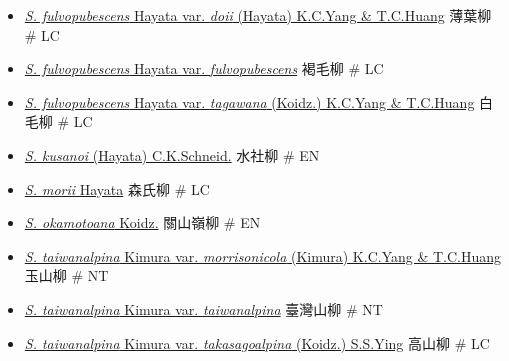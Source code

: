 \begin{itemize}
  \begin{itemize}
        \item[] \href{http://www.theplantlist.org/tpl1.1/search?q=Salix+fulvopubescens+var.+doii}{\textit{S. fulvopubescens} Hayata var. \textit{doii} (Hayata) K.C.Yang \& T.C.Huang}   薄葉柳  \# LC
        \item[] \href{http://www.theplantlist.org/tpl1.1/search?q=Salix+fulvopubescens+var.+fulvopubescens}{\textit{S. fulvopubescens} Hayata var. \textit{fulvopubescens}}   褐毛柳  \# LC
        \item[] \href{http://www.theplantlist.org/tpl1.1/search?q=Salix+fulvopubescens+var.+tagawana}{\textit{S. fulvopubescens} Hayata var. \textit{tagawana} (Koidz.) K.C.Yang \& T.C.Huang}   白毛柳  \# LC
        \item[] \href{http://www.theplantlist.org/tpl1.1/search?q=Salix+kusanoi}{\textit{S. kusanoi} (Hayata) C.K.Schneid.}   水社柳  \# EN
        \item[] \href{http://www.theplantlist.org/tpl1.1/search?q=Salix+morii}{\textit{S. morii} Hayata}   森氏柳  \# LC
        \item[] \href{http://www.theplantlist.org/tpl1.1/search?q=Salix+okamotoana}{\textit{S. okamotoana} Koidz.}   關山嶺柳  \# EN
        \item[] \href{http://www.theplantlist.org/tpl1.1/search?q=Salix+taiwanalpina+var.+morrisonicola}{\textit{S. taiwanalpina} Kimura var. \textit{morrisonicola} (Kimura) K.C.Yang \& T.C.Huang}   玉山柳  \# NT
        \item[] \href{http://www.theplantlist.org/tpl1.1/search?q=Salix+taiwanalpina+var.+taiwanalpina}{\textit{S. taiwanalpina} Kimura var. \textit{taiwanalpina}}   臺灣山柳  \# NT
        \item[] \href{http://www.theplantlist.org/tpl1.1/search?q=Salix+taiwanalpina+var.+takasagoalpina}{\textit{S. taiwanalpina} Kimura var. \textit{takasagoalpina} (Koidz.) S.S.Ying}   高山柳  \# LC

\end{itemize}
\end{itemize}
